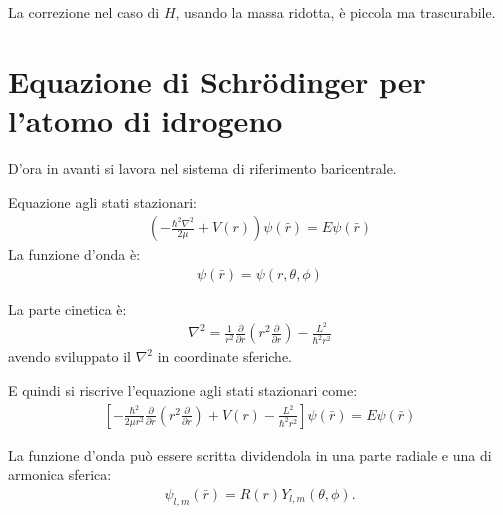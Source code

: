 La correzione nel caso di $H$, usando la massa ridotta, è piccola ma trascurabile.

\section{Equazione di Schrödinger per l'atomo di idrogeno} %
D'ora in avanti si lavora nel sistema di riferimento baricentrale.

Equazione agli stati stazionari:
\begin{equation}\begin{split}
\left(-\frac{\hbar ^2\nabla ^2}{2\mu}+V\left(r\right)\right)\psi \left(\bar r\right)=E\psi \left(\bar r\right)
\end{split}\end{equation}
La funzione d'onda è:
\begin{equation}\begin{split}
\psi \left(\bar r\right)=\psi \left(r,\theta,\phi\right)
\end{split}\end{equation}

La parte cinetica è:
\begin{equation}\begin{split}
\nabla ^2=\frac{1}{r^2}\frac{\partial }{\partial r}\left(r^2\frac{\partial }{\partial r}\right)-\frac{L^2}{\hbar ^2r^2}
\end{split}\end{equation}
avendo sviluppato il $\nabla ^2$ in coordinate sferiche.

E quindi si riscrive l'equazione agli stati stazionari come:
\begin{equation}\begin{split}
\left[-\frac{\hbar ^2}{2\mu r^2}\frac{\partial }{\partial r}\left(r^2\frac{\partial }{\partial r}\right)+V\left(r\right)-\frac{L^2}{\hbar ^2r^2}\right]\psi \left(\bar r\right)=E\psi \left(\bar r\right)
\end{split}\end{equation}

La funzione d'onda può essere scritta dividendola in una parte radiale e una di armonica sferica:
\begin{equation}\begin{split}
\psi _{l,m}\left(\bar r\right)=R\left(r\right)Y_{l,m}\left(\theta,\phi\right).
\end{split}\end{equation}

